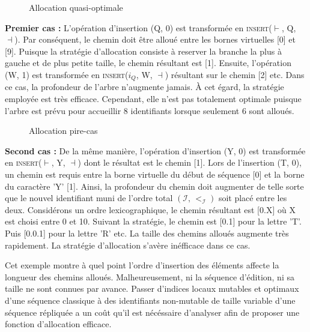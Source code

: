 \begin{wrapfigure}{r}{0.5\textwidth}
  \vspace{-15pt}
  \centering
  
  \caption{\label{repl:fig:allocpathexampleA}Allocation quasi-optimale}
  \vspace{-15pt}
\end{wrapfigure}

\textbf{Premier cas :} L'opération d'insertion (Q, 0) est transformée en
\textsc{insert}($\vdash$, Q, $\dashv$). Par conséquent, le chemin doit être
alloué entre les bornes virtuelles [0] et [9]. Puisque la stratégie d'allocation
consiste à reserver la branche la plus à gauche et de plus petite taille, le
chemin résultant est [1]. Ensuite, l'opération (W, 1) est transformée en
\textsc{insert}($i_Q$, W, $\dashv$) résultant sur le chemin [2] etc.  Dans ce
cas, la profondeur de l'arbre n'augmente jamais. À cet égard, la stratégie
employée est très efficace. Cependant, elle n'est pas totalement optimale
puisque l'arbre est prévu pour accueillir 8 identifiants lorsque seulement 6
sont alloués.

\begin{wrapfigure}{r}{0.5\textwidth}
  \vspace{-10pt}
  \centering
  
  \caption{\label{repl:fig:allocpathexampleB}Allocation pire-cas}
  \vspace{-10pt}
\end{wrapfigure}

\textbf{Second cas :} De la même manière, l'opération d'insertion (Y, 0) est
transformée en \textsc{insert}($\vdash$, Y, $\dashv$) dont le résultat est le
chemin [1]. Lors de l'insertion (T, 0), un chemin est requis entre la borne
virtuelle du début de séquence [0] et la borne du caractère 'Y' [1]. Ainsi, la
profondeur du chemin doit augmenter de telle sorte que le nouvel identifiant
muni de l'ordre total $(\mathcal{I},\,<_\mathcal{I})$ soit placé entre les
deux. Considérons un ordre lexicographique, le chemin résultant est [0.X] où X
est choisi entre 0 et 10. Suivant la stratégie, le chemin est [0.1] pour la
lettre 'T'. Puis [0.0.1] pour la lettre 'R' etc. La taille des chemins alloués
augmente très rapidement.  La stratégie d'allocation s'avère inéfficace dans ce
cas.

Cet exemple montre à quel point l'ordre d'insertion des éléments affecte la
longueur des chemins alloués. Malheureusement, ni la séquence d'édition, ni sa
taille ne sont connues par avance.  Passer d'indices locaux mutables et optimaux
d'une séquence classique à des identifiants non-mutable de taille variable d'une
séquence répliquée a un coût qu'il est nécéssaire d'analyser afin de proposer
une fonction d'allocation efficace.

